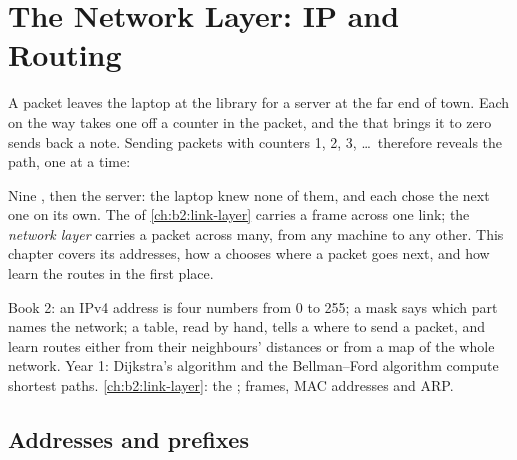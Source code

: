 \chapter{The Network Layer: IP and Routing}\label{ch:b2:network-layer}

A packet leaves the laptop at the library for a server at the far end of town. Each  on the way takes one off
a counter in the packet, and the  that brings it to zero sends back a note. Sending packets with counters 1,
2, 3, \dots\ therefore reveals the path, one  at a time:

\label{out:b2:network-layer:hook}

Nine , then the server: the laptop knew none of them, and each  chose the next one on its own. The  of
\cref{ch:b2:link-layer} carries a frame across one link; the \emph{network layer} carries a packet across many,
from any machine to any other. This chapter covers its addresses, how a  chooses where a packet goes next, and
how  learn the routes in the first place.

\begin{recall}
Book 2: an IPv4 address is four numbers from 0 to 255; a mask says which part names the network; a  table,
read by hand, tells a  where to send a packet, and  learn routes either from their neighbours' distances
or from a map of the whole network. Year 1: Dijkstra's algorithm and the Bellman--Ford algorithm compute shortest
paths. \cref{ch:b2:link-layer}: the ; frames, MAC addresses and ARP.
\end{recall}

\section{Addresses and prefixes}\label{sec:b2:network-layer:addresses}

